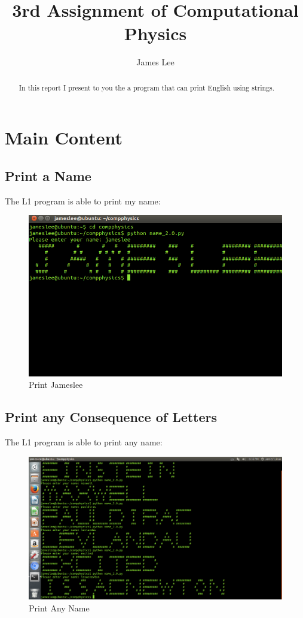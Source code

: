 \documentclass[10pt,a4paper]{article}
\author{James Lee}
\title{3rd Assignment of Computational Physics}
\begin{document}
	\maketitle
	\begin{abstract}
		In this report I present to you the a program that can print English using strings.
	\end{abstract}
	\section{Main Content}
	\subsection{Print a Name}
	The L1 program is able to print my name:
	\begin{figure}[htbp]
		\centering
		\includegraphics[width=5in]{name_1.png}
		\caption{Print Jameslee}
	\end{figure}
	\subsection{Print any Consequence of Letters}
	The L1 program is able to print any name:
	\begin{figure}[htbp]
		\centering
		\includegraphics[width=7in]{name_2.png}
		\caption{Print Any Name}
	\end{figure}
	
\end{document}
